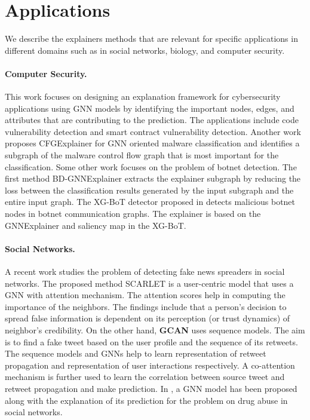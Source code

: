 \section{Applications}
\label{sec::application}
We describe the explainers methods that are relevant for specific applications in different domains such as in social networks, biology, and computer security.%



\paragraph{Computer Security.} This work \cite{he2022illuminati} focuses on designing an explanation framework for cybersecurity applications using GNN models by identifying the important nodes, edges, and attributes that are contributing to the prediction. The applications include code vulnerability detection and smart contract vulnerability detection. Another work \cite{herath2022cfgexplainer} proposes CFGExplainer for GNN oriented malware classification and identifies a subgraph of the malware control flow graph that is most important for the classification. Some other work focuses on the problem of botnet detection. The first method BD-GNNExplainer \cite{zhu2022interpretability} extracts the explainer subgraph by reducing the loss between the classification results generated by the input subgraph and the entire input graph. The XG-BoT detector proposed in \cite{lo2023xg} detects malicious botnet nodes in botnet communication graphs. The explainer is based on the GNNExplainer and saliency map in the XG-BoT. %



\paragraph{Social Networks.}A recent work \cite{rath2021scarlet} studies the problem of detecting fake news spreaders in social networks. The proposed method SCARLET is a user-centric model that uses a GNN with attention mechanism. The attention scores help in computing the importance of the neighbors. The findings include that a person’s decision to spread false information is dependent on its perception (or trust dynamics) of neighbor’s credibility. On the other hand, \textbf{GCAN} \cite{GCAN} uses sequence models. The aim is to find a fake tweet based on the user profile and the sequence of its retweets. The sequence models and GNNs help to learn representation of retweet propagation and representation of user interactions respectively. A co-attention mechanism is further used to learn the correlation between source tweet and retweet propagation and make prediction. In \cite{ma2021understanding}, a GNN model has been proposed along with the explanation of its prediction for the problem on drug abuse in social networks.




